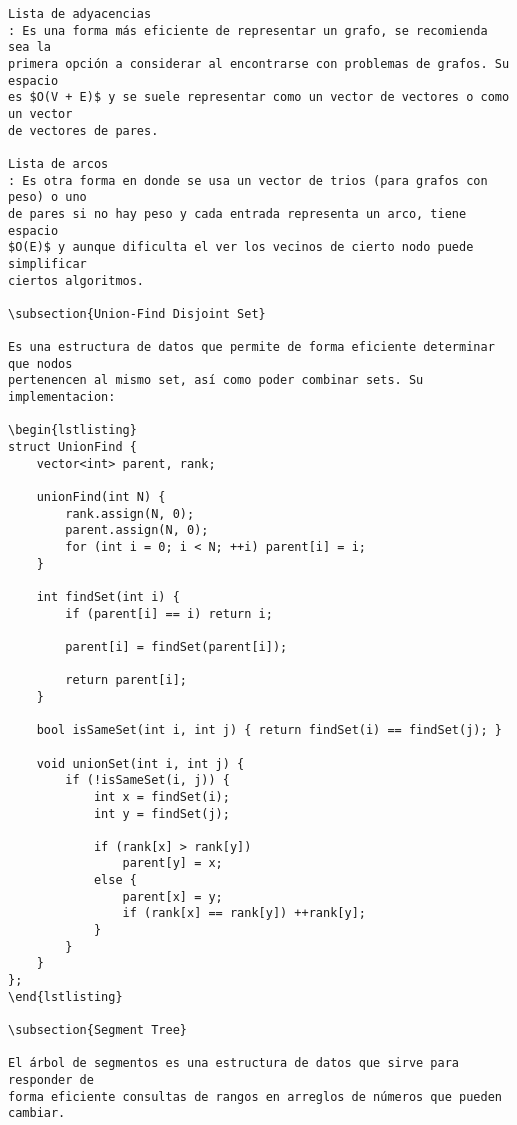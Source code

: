 \documentclass[11pt]{article}
\begin{document}
\begin{verbatim}
Lista de adyacencias
: Es una forma más eficiente de representar un grafo, se recomienda sea la
primera opción a considerar al encontrarse con problemas de grafos. Su espacio
es $O(V + E)$ y se suele representar como un vector de vectores o como un vector
de vectores de pares.

Lista de arcos
: Es otra forma en donde se usa un vector de trios (para grafos con peso) o uno
de pares si no hay peso y cada entrada representa un arco, tiene espacio
$O(E)$ y aunque dificulta el ver los vecinos de cierto nodo puede simplificar
ciertos algoritmos.

\subsection{Union-Find Disjoint Set}

Es una estructura de datos que permite de forma eficiente determinar que nodos
pertenencen al mismo set, así como poder combinar sets. Su implementacion:

\begin{lstlisting}
struct UnionFind {
    vector<int> parent, rank;

    unionFind(int N) {
        rank.assign(N, 0);
        parent.assign(N, 0);
        for (int i = 0; i < N; ++i) parent[i] = i;
    }

    int findSet(int i) {
        if (parent[i] == i) return i;

        parent[i] = findSet(parent[i]);

        return parent[i];
    }

    bool isSameSet(int i, int j) { return findSet(i) == findSet(j); }

    void unionSet(int i, int j) {
        if (!isSameSet(i, j)) {
            int x = findSet(i);
            int y = findSet(j);

            if (rank[x] > rank[y])
                parent[y] = x;
            else {
                parent[x] = y;
                if (rank[x] == rank[y]) ++rank[y];
            }
        }
    }
};
\end{lstlisting}

\subsection{Segment Tree}

El árbol de segmentos es una estructura de datos que sirve para responder de
forma eficiente consultas de rangos en arreglos de números que pueden cambiar.


\end{verbatim}
\end{document}
